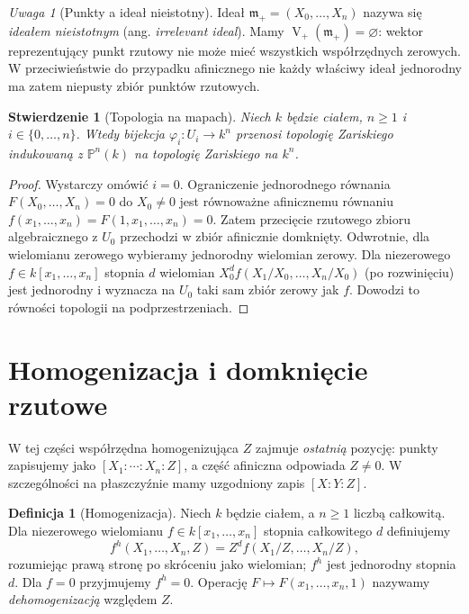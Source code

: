 \documentclass[11pt,a4paper,openany]{report}
\numberwithin{equation}{section}
\theoremstyle{plain}
\newtheorem{stwierdzenie}[twierdzenie]{Stwierdzenie}
\theoremstyle{definition}
\newtheorem{definicja}[twierdzenie]{Definicja}
\theoremstyle{remark}
\newtheorem{uwaga}[twierdzenie]{Uwaga}
\newcommand{\PP}{\mathbb P}
\newcommand{\V}{\operatorname V}
\begin{document}
\begin{uwaga}[Punkty a ideał nieistotny]
Ideał $\mathfrak m_+=(X_0,\dots,X_n)$ nazywa się
\emph{ideałem nieistotnym} (ang. \emph{irrelevant ideal}).
Mamy $\V_+(\mathfrak m_+)=\varnothing$: wektor reprezentujący
punkt rzutowy nie może mieć wszystkich współrzędnych zerowych.
W przeciwieństwie do przypadku afinicznego nie każdy właściwy
ideał jednorodny ma zatem niepusty zbiór punktów rzutowych.
\end{uwaga}

\begin{stwierdzenie}[Topologia na mapach]
Niech $k$ będzie ciałem, $n\ge1$ i $i\in\{0,\dots,n\}$.
Wtedy bijekcja $\varphi_i:U_i\to k^n$
przenosi topologię Zariskiego indukowaną z $\PP^n(k)$
na topologię Zariskiego na $k^n$.
\end{stwierdzenie}
\begin{proof}
Wystarczy omówić $i=0$. Ograniczenie jednorodnego równania
$F(X_0,\dots,X_n)=0$ do $X_0\ne0$ jest równoważne
afinicznemu równaniu $f(x_1,\dots,x_n)=F(1,x_1,\dots,x_n)=0$.
Zatem przecięcie rzutowego zbioru algebraicznego z $U_0$
przechodzi w zbiór afinicznie domknięty. Odwrotnie,
dla wielomianu zerowego wybieramy jednorodny wielomian
zerowy. Dla niezerowego $f\in k[x_1,\dots,x_n]$ stopnia $d$
wielomian $X_0^df(X_1/X_0,\dots,X_n/X_0)$
(po rozwinięciu) jest jednorodny i wyznacza na $U_0$
taki sam zbiór zerowy jak $f$. Dowodzi to równości
topologii na podprzestrzeniach.
\end{proof}

\section{Homogenizacja i domknięcie rzutowe}

W tej części współrzędna homogenizująca $Z$ zajmuje
\emph{ostatnią} pozycję: punkty zapisujemy jako
$[X_1:\cdots:X_n:Z]$, a część afiniczna odpowiada $Z\ne0$.
W szczególności na płaszczyźnie mamy uzgodniony zapis $[X:Y:Z]$.

\begin{definicja}[Homogenizacja]
Niech $k$ będzie ciałem, a $n\ge1$ liczbą całkowitą.
Dla niezerowego wielomianu $f\in k[x_1,\ldots,x_n]$
stopnia całkowitego $d$ definiujemy
\[
 f^h(X_1,\ldots,X_n,Z)
 =Z^d f(X_1/Z,\ldots,X_n/Z),
\]
rozumiejąc prawą stronę po skróceniu jako wielomian;
$f^h$ jest jednorodny stopnia $d$. Dla $f=0$ przyjmujemy
$f^h=0$. Operację $F\mapsto F(x_1,\ldots,x_n,1)$
nazywamy \emph{dehomogenizacją} względem $Z$.
\end{definicja}
\end{document}
